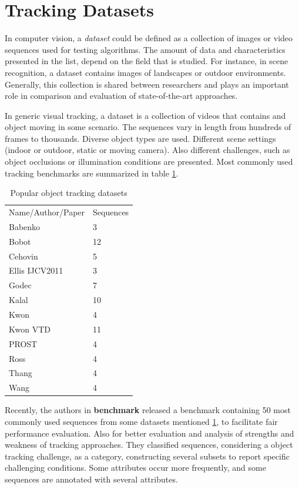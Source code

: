 \section{Tracking Datasets}

In computer vision, a \textit{dataset} could be defined as a collection of images or video sequences used for testing algorithms. The amount of data and characteristics presented in the list, depend on the field that is studied. For instance, in scene recognition, a dataset contains images of landscapes or outdoor environments. Generally, this collection is shared between researchers and plays an important role in comparison and evaluation of state-of-the-art approaches.

In generic visual tracking, a dataset is a collection of videos that contains and object moving in some scenario. The sequences vary in length from hundreds of frames to thousands. Diverse object types are used. Different scene settings (indoor or outdoor, static or moving camera). Also different challenges, such as object occlusions or illumination conditions are presented. Most commonly used tracking benchmarks are summarized in table \ref{table:datasets}.

\begin{table}[h!]
\centering
\begin{tabular}{|ll|}
\hline
Name/Author/Paper & Sequences \\
Babenko           & 3         \\
Bobot             & 12        \\
Cehovin           & 5         \\
Ellis IJCV2011    & 3         \\
Godec             & 7         \\
Kalal             & 10        \\
Kwon              & 4         \\
Kwon VTD          & 11        \\
PROST             & 4         \\
Ross              & 4         \\
Thang             & 4         \\
Wang              & 4         \\
\hline
\end{tabular}
\caption{Popular object tracking datasets}
\label{table:datasets}
\end{table}


Recently, the authors in \textbf{benchmark} released a benchmark containing 50 most commonly used sequences from some datasets mentioned \ref{table:datasets}, to facilitate fair performance evaluation. Also for better evaluation and analysis of strengths and weakness of tracking approaches. They classified sequences, considering a object tracking challenge, as a category, constructing several subsets to report specific challenging conditions. Some attributes occur more frequently, and some sequences are annotated with several attributes.



